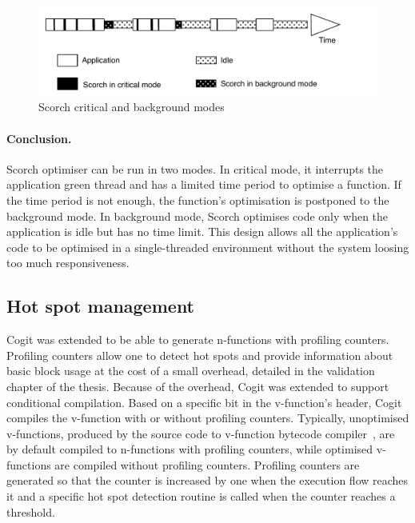 \documentclass[a4paper,12pt,twoside]{../includes/ThesisStyle}
\begin{document}
\begin{figure}[h!]
    \begin{center}
        \includegraphics[width=0.95\linewidth]{ScorchModes}
        \caption{Scorch critical and background modes}
        \label{fig:ScorchModes}
    \end{center}
\end{figure}


\paragraph{Conclusion.}Scorch optimiser can be run in two modes. In critical mode, it interrupts the application green thread and has a limited time period to optimise a function. If the time period is not enough, the function's optimisation is postponed to the background mode. In background mode, Scorch optimises code only when the application is idle but has no time limit. This design allows all the application's code to be optimised in a single-threaded environment without the system loosing too much responsiveness.

\subsection{Hot spot management}
\label{sec:hotSpot}

Cogit was extended to be able to generate n-functions with profiling counters. Profiling counters allow one to detect hot spots and provide information about basic block usage at the cost of a small overhead, detailed in the validation chapter of the thesis. Because of the overhead, Cogit was extended to support conditional compilation. Based on a specific bit in the v-function's header, Cogit compiles the v-function with or without profiling counters. Typically, unoptimised v-functions, produced by the source code to v-function bytecode compiler~\cite{Bera13a}, are by default compiled to n-functions with profiling counters, while optimised v-functions are compiled without profiling counters. Profiling counters are generated so that the counter is increased by one when the execution flow reaches it and a specific hot spot detection routine is called when the counter reaches a threshold.
\end{document}
